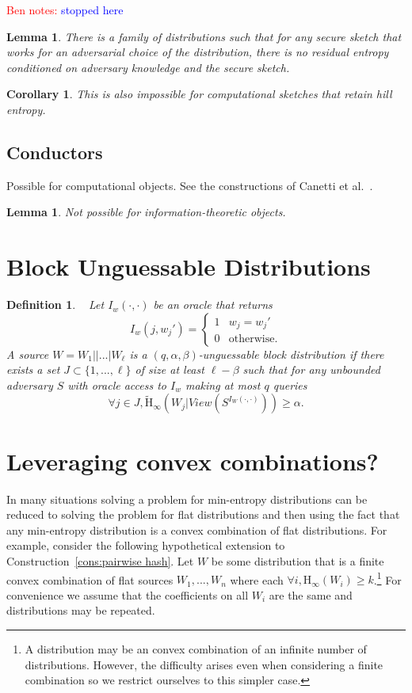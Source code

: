\documentclass[11pt]{article}
\newcommand{\consref}[1]{\mbox{Construction~\ref{#1}}}
\newcommand{\Hoo}{\mathrm{H}_\infty}
\newcommand{\Hav}{\tilde{\mathrm{H}}_\infty}
\newtheorem{lemma}[theorem]{Lemma}
\newtheorem{corollary}[theorem]{Corollary}
\newtheorem{definition}[theorem]{Definition}
\newcommand{\authnote}[2]{{\textcolor{red}{\textsf{#1 notes: }\textcolor{blue}{ #2}}\marginpar{\textcolor{red}{\textbf{!!!!!}}}}}
\newcommand{\authnote}[2]{}
\newcommand{\bnote}[1]{{\authnote{Ben}{#1}}}
\begin{document}
\bnote{stopped here}
\begin{lemma}
There is a family of distributions such that for any secure sketch that works for an adversarial choice of the distribution, there is no residual entropy conditioned on adversary knowledge and the secure sketch.
\end{lemma}

\begin{corollary}
This is also impossible for computational sketches that retain hill entropy.
\end{corollary}

\subsection{Conductors}
Possible for computational objects.  See the constructions of Canetti et al.~\cite{canetti2014key}.
\begin{lemma}
Not possible for information-theoretic objects.
\end{lemma}



\appendix
\section{Block Unguessable Distributions}
\begin{definition}~\cite[Definition 4.2]{canetti2014key}
\label{def:block guessable}
Let $I_w (\cdot, \cdot)$ be an oracle that returns \[I_w(j, w_j')=
\begin{cases}
1 & w_j = w_j'\\
0 & \text{otherwise}.
\end{cases}
\]
A source $W = W_1||...|W_\ell$ is a $(q, \alpha, \beta)$-\emph{unguessable block distribution} if there exists a set $J\subset\{1,..., \ell\}$ of size at least $\ell -\beta$ such that for any unbounded adversary $S$ with oracle access to $I_w$ making at most $q$ queries
\[
\forall j\in J, \Hav(W_j |View(S^{I_{W}(\cdot, \cdot)}))\geq \alpha.
\]
\end{definition}
\section{Leveraging convex combinations?}
\label{sec:convex comb}
In many situations solving a problem for min-entropy distributions can be reduced to solving the problem for flat distributions and then using the fact that any min-entropy distribution is a convex combination of flat distributions.  For example, consider the following hypothetical extension to \consref{cons:pairwise hash}.  Let $W$ be some distribution that is a finite convex combination of flat sources $W_1,..., W_n$ where each $\forall i, \Hoo(W_i)\ge k$.\footnote{A distribution may be an  convex combination of an infinite number of distributions.  However, the difficulty arises even when considering a finite combination so we restrict ourselves to this simpler case.}  For convenience we assume that the coefficients on all $W_i$ are the same and distributions may be repeated. 
\end{document}
